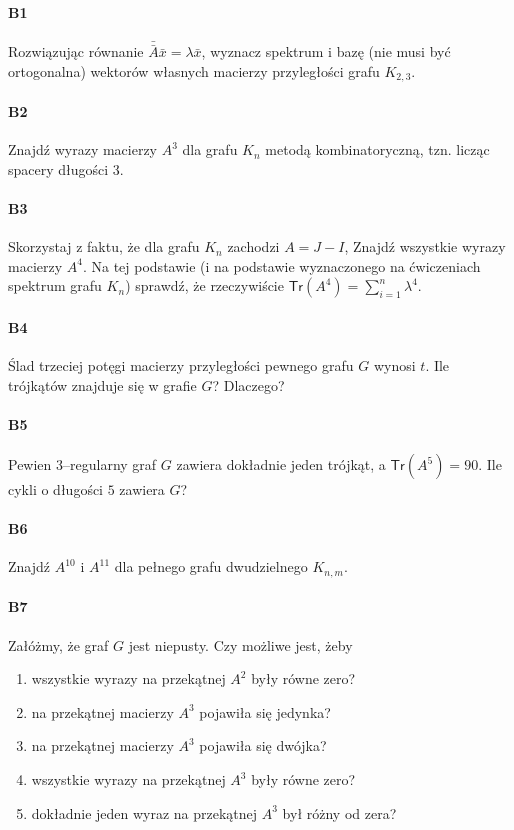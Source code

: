 \documentclass[a4paper,12pt]{article}
\theoremstyle{definition}%
\theoremstyle{definition}
\theoremstyle{problem}
\begin{document}
\paragraph{B1} Rozwiązując równanie $\bar{\bar{A}}\bar{x} = \lambda \bar{x}$, wyznacz spektrum i bazę (nie musi być ortogonalna) wektorów własnych macierzy przyległości grafu $K_{2,3}$.

\paragraph{B2} Znajdź wyrazy macierzy $A^3$ dla grafu $K_n$ metodą kombinatoryczną, tzn. licząc spacery długości 3.

\paragraph{B3} Skorzystaj z faktu, że dla grafu $K_n$ zachodzi $A = J - I$, Znajdź wszystkie wyrazy macierzy $A^4$. Na tej podstawie (i na podstawie wyznaczonego na ćwiczeniach spektrum grafu $K_n$) sprawdź, że rzeczywiście $\mathsf{Tr}(A^4) = \sum ^n _{i=1}\lambda ^4$.

\paragraph{B4} Ślad trzeciej potęgi macierzy przyległości pewnego grafu $G$ wynosi $t$. Ile trójkątów znajduje się w grafie $G$? Dlaczego?

\paragraph{B5} Pewien 3–regularny graf $G$ zawiera dokładnie jeden trójkąt, a $\mathsf{Tr}(A^5) = 90$. Ile cykli o długości $5$ zawiera $G$?

\paragraph{B6} Znajdź $A^{10}$ i $A^{11}$ dla pełnego grafu dwudzielnego $K_{n,m}$.

\paragraph{B7} Załóżmy, że graf $G$ jest niepusty. Czy możliwe jest, żeby
\begin{enumerate}[label=\alph*)]
\item wszystkie wyrazy na przekątnej $A^2$ były równe zero?
\item na przekątnej macierzy $A^3$ pojawiła się jedynka?
\item na przekątnej macierzy $A^3$ pojawiła się dwójka?
\item wszystkie wyrazy na przekątnej $A^3$ były równe zero?
\item dokładnie jeden wyraz na przekątnej $A^3$ był różny od zera?
\end{enumerate}
\end{document}
